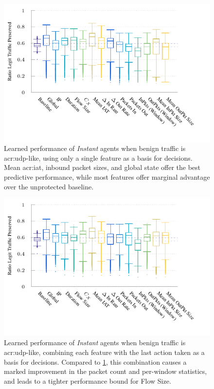 \begin{figure}
	\centering
	\includegraphics[width=\linewidth]{plots/marl/ftprep-cap-box}
	\caption[Learned performance of \emph{Instant} agents when benign traffic is UDP-like, using only a single feature as a basis for decisions.]{
		Learned performance of \emph{Instant} agents when benign traffic is \gls{acr:udp}-like, using only a single feature as a basis for decisions.
		Mean \gls{acr:iat}, inbound packet sizes, and global state offer the best predictive performance, while most features offer marginal advantage over the unprotected baseline.
		\label{fig:udp-feature-plots}
	}
\end{figure}

\begin{figure}
	\centering
	\includegraphics[width=\linewidth]{plots/marl/ftprep-laf-cap-box}
	\caption[Learned performance of \emph{Instant} agents when benign traffic is UDP-like, jointly tiling each feature with the last action taken.]{
		Learned performance of \emph{Instant} agents when benign traffic is \gls{acr:udp}-like, combining each feature with the last action taken as a basis for decisions.
		Compared to \cref{fig:udp-feature-plots}, this combination causes a marked improvement in the packet count and per-window statistics, and leads to a tighter performance bound for Flow Size.
		\label{fig:udp-laf-feature-plots}
	}
\end{figure}

